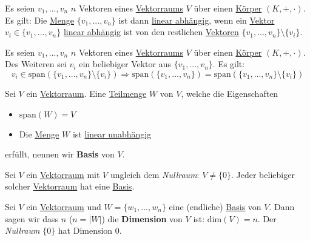 \documentclass[../../main.tex]{subfiles}
\begin{document}
	\begin{theorem}
		Es seien $v_1,...,v_n$ $n$ Vektoren eines \hyperref[def:Vektorraum]{Vektorraums} $V$ über einen \hyperref[def:Körper]{Körper} $(K,+,\cdot)$. Es gilt: Die \hyperref[def:Menge]{Menge} $\{v_1,...,v_n\}$ ist dann \hyperref[def:LineareAbhängigkeitMenge]{linear abhängig}, wenn ein \hyperref[def:Vektor]{Vektor} $v_i \in\{v_1,...,v_n\}$ \hyperref[def:LineareAbhängigkeit]{linear abhängig} ist von den restlichen \hyperref[def:Vektor]{Vektoren} $\{v_1,...,v_n\}\setminus \{v_i\}$. 
	\end{theorem}

	\begin{theorem}
		Es seien $v_1,...,v_n$ $n$ Vektoren eines \hyperref[def:Vektorraum]{Vektorraums} $V$ über einen \hyperref[def:Körper]{Körper} $(K,+,\cdot)$. Des Weiteren sei $v_i$ ein beliebiger Vektor aus $\{v_1,...,v_n\}$. Es gilt: $$v_i \in \textrm{span}(\{v_1,...,v_n\}\setminus\{v_i\}) \Rightarrow \textrm{span}(\{v_1,...,v_n\}) = \textrm{span}(\{v_1,...,v_n\}\setminus\{v_i\})$$
	\end{theorem}

	\begin{definition}[Basis]
		\label{def:Basis}
		Sei $V$ ein \hyperref[def:Vektorraum]{Vektorraum}. Eine \hyperref[def:Teilmenge]{Teilmenge} $W$ von $V$, welche die Eigenschaften
		\begin{itemize}
			\item $\textrm{span}(W) = V$
			\item Die \hyperref[def:Menge]{Menge} $W$ ist \hyperref[def:LineareUnabhängigkeitMenge]{linear unabhängig}
		\end{itemize}
		erfüllt, nennen wir \textbf{Basis} von $V$. 
	\end{definition}

	\begin{theorem}
		Sei $V$ ein \hyperref[def:Vektorraum]{Vektorraum} mit $V$ ungleich dem \textit{Nullraum}: $V\not = \{0\}$. Jeder beliebiger solcher \hyperref[def:Vektorraum]{Vektorraum} hat eine \hyperref[def:Basis]{Basis}.
	\end{theorem}

	\begin{definition}[Dimension]
		\label{def:Dimension}
		Sei $V$ ein \hyperref[def:Vektorraum]{Vektorraum} und $W = \{w_1,...,w_n\}$ eine (endliche) \hyperref[def:Basis]{Basis} von $V$. Dann sagen wir dass $n$ ($n=|W|$) die \textbf{Dimension} von $V$ ist: $\textrm{dim}(V)=n$. Der \textit{Nullraum} $\{0\}$ hat Dimension 0. 
	\end{definition}
\end{document}
